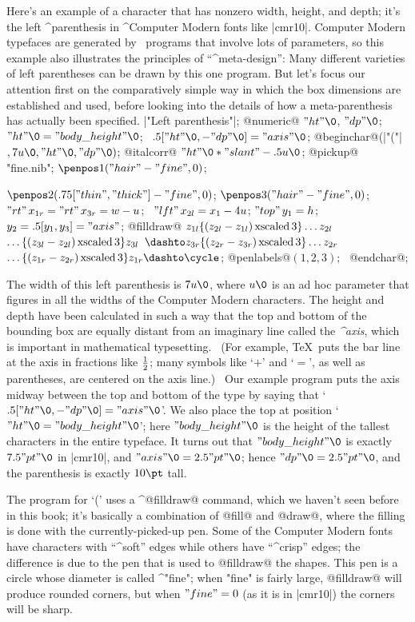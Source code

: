 {{{{Here's an example of a character that has nonzero width, height, and depth;
it's the left ^{parenthesis} in ^{Computer Modern} fonts like |cmr10|.
Computer Modern typefaces are generated by \MF\ programs that involve
lots of parameters, so this example also illustrates the principles of
``^{meta-design}'': Many different varieties of left parentheses can be
drawn by this one program. But let's focus our attention first on the
comparatively simple way in which the box dimensions are established and
used, before looking into the details of how a meta-parenthesis has
actually been specified.
\def\xs(#1,#2){\{(z_{#1}-z_{#2})\,{\rm xscaled}\,3\}}%
\begindisplay
|"Left parenthesis"|;\cr
@numeric@ $"ht"\0$, $"dp"\0$;\cr
$"ht"\0="body\_height"\0$; \ $.5["ht"\0,-"dp"\0]="axis"\0$;\cr
@beginchar@\kern1pt(|"("|$,7u\0,"ht"\0,"dp"\0)$;\cr
@italcorr@ $"ht"\0\ast"slant"-.5u\0$;\cr
@pickup@ "fine.nib";\cr
$\penpos1("hair"-"fine",0)$;\strut{}\cr
$\penpos2(.75["thin","thick"]-"fine",0)$;\cr
$\penpos3("hair"-"fine",0)$;\cr
$\mathop{"rt"}x_{1r}=\mathop{"rt"}x_{3r}= w-u$; \
 $\mathop{"lft"}x_{2l}=x_1-4u$;\cr
$\mathop{"top"}y_1=h$; \
 $y_2=.5[y_1,y_3]="axis"$;\cr
@filldraw@ $z_{1l}\xs(2l,1l)\ldots z_{2l}$\cr
\qquad$\ldots\xs(3l,2l)z_{3l}$\cr
\qquad$\dashto z_{3r}\xs(2r,3r)\ldots z_{2r}$\cr
\qquad$\ldots\xs(1r,2r)z_{1r}\dashto\cycle$;\cr
@penlabels@$(1,2,3)$; \ @endchar@;\cr
\enddisplay

The width of this left parenthesis is $7u\0$, where $u\0$
is an ad hoc parameter that figures in all the widths of the Computer
Modern characters. The height and depth have been calculated in such a way
that the top and bottom of the bounding box are equally distant from an
imaginary line called the {\sl^{axis}}, which is important in mathematical
typesetting. \ (For example, \TeX\ puts the bar line at the axis
in fractions like $1\over2$; many symbols like `$+$' and `$=$', as well as
parentheses, are centered on the axis line.) \ Our example program puts the
axis midway between the top and bottom of the type by saying that
`$.5["ht"\0,-"dp"\0]="axis"\0$'.  We also place the top at position
`$"ht"\0="body\_height"\0$'\thinspace; here $"body\_height"\0$ is the
height of the tallest characters in the entire typeface.
It turns out that $"body\_height"\0$ is exactly $7.5"pt"\0$ in |cmr10|, and
$"axis"\0=2.5"pt"\0$; hence $"dp"\0=2.5"pt"\0$,
and the parenthesis is exactly $10\pt$ tall.

The program for `(' uses a ^@filldraw@ command, which we haven't
seen before in this book; it's basically a combination of @fill@
and @draw@, where the filling is done with the currently-picked-up pen.
Some of the Computer Modern fonts have characters with ``^{soft}'' edges
while others have ``^{crisp}'' edges; the difference is due to the pen that
is used to @filldraw@ the shapes. This pen is a circle whose diameter
is called ^"fine"; when "fine" is fairly large, @filldraw@ will produce
rounded corners, but when $"fine"=0$ (as it is in |cmr10|) the corners
will be sharp.

}}}}
